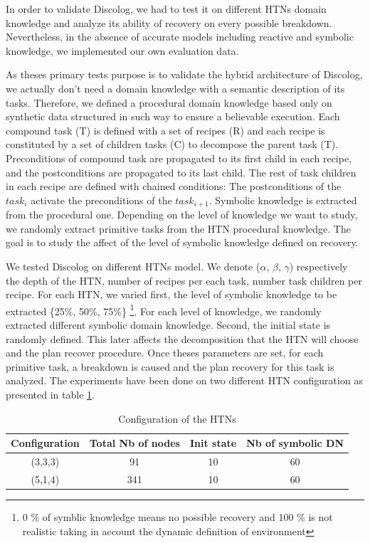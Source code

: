 \documentclass[conference]{IEEEtran}
\begin{document}
	\par In order to validate  Discolog, we had to test it on different HTNs domain knowledge and analyze its ability of recovery on every possible breakdown. Nevertheless, in the absence of accurate models including reactive and symbolic knowledge, we  implemented our own evaluation data. 
	\par As theses primary tests purpose is to validate the hybrid architecture of Discolog, we actually don't need a domain knowledge with a semantic description of its tasks. Therefore, we defined a procedural domain knowledge based only on synthetic data  structured in such way to ensure a believable execution.  Each compound task (T) is defined with a set of recipes (R) and each recipe is constituted by a set of children tasks (C) to decompose the parent task (T). Preconditions of compound task are propagated to its first child in each recipe, and the postconditions are propagated to its last child. 
	The rest of task children in each recipe are defined with chained conditions: The postconditions of the $task_i$ activate the preconditions of the $task_{i+1}$. Symbolic knowledge is extracted from the procedural one. Depending on the level of knowledge we want to study, we randomly extract primitive tasks from the HTN procedural knowledge.   The goal is to study the affect of the level of symbolic knowledge defined on recovery.
	\par We tested Discolog on different HTNs model. We denote ($\alpha$, $\beta$, $\gamma$)  respectively the depth of the HTN, number of recipes per each task, number task children per recipe. For each HTN, we varied first, the level of symbolic knowledge to be extracted \{25\%, 50\%, 75\%\} \footnote{0 \% of symblic knowledge means no possible recovery and 100 \% is not realistic taking in account the dynamic definition of environment}. For each level of knowledge, we randomly extracted different symbolic domain knowledge.  Second, the initial state is randomly defined. This later affects the decomposition that the HTN will choose and the plan recover procedure. 
	Once theses parameters are set, for each primitive task, a breakdown is caused and the plan recovery for this task is analyzed. The experiments have been done on two different HTN configuration as presented in table \ref{table}.
		\begin{table}[h]
				
				\centering %
				\caption{Configuration of the HTNs } %
				\begin{tabular}{|c|c|c|c|} 
					\hline
					Configuration & Total Nb of nodes & Init state & Nb of symbolic DN\\
					\hline
					(3,3,3) & 91 & 10 & 60  \\
					(5,1,4) & 341 & 10 & 60  \\
					\hline
				\end{tabular}
				\label{table} %
			\end{table}
			
\end{document}
